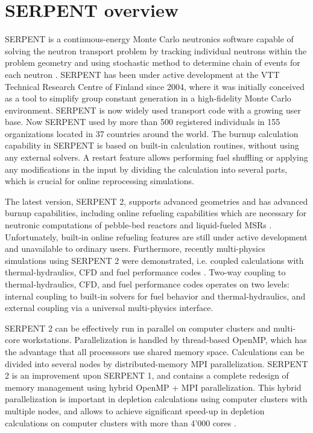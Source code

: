 \section{SERPENT overview}
SERPENT is a continuous-energy Monte Carlo neutronics software capable of solving the neutron transport problem by tracking individual neutrons within the problem geometry and using stochastic method to determine chain of events for each neutron \cite{leppanen_serpent_2015}. SERPENT has been under active development at the VTT Technical Research Centre of Finland since 2004, where it was initially conceived as a tool to simplify group constant generation in a high-fidelity Monte Carlo environment. SERPENT is now widely used transport code  with a growing user base. Now SERPENT used by more than 500 registered individuals in 155 organizations located in 37 countries around the world. The burnup calculation capability in SERPENT is based on built-in calculation routines, without using any external solvers. A restart feature allows performing fuel shuffling or applying any modifications in the input by dividing the calculation into several parts, which is crucial for online reprocessing simulations.

The latest version, SERPENT 2, supports advanced geometries and has advanced burnup capabilities, including online refueling capabilities which are necessary for neutronic computations of pebble-bed reactors and liquid-fueled \glspl{MSR} \cite{aufiero_extended_2013}. Unfortunately, built-in online refueling features are still under active development and unavailable to ordinary users. Furthermore, recently multi-physics simulations using SERPENT 2 were demonstrated, i.e. coupled calculations with thermal-hydraulics, \gls{CFD} and fuel performance codes \cite{leppanen_numerical_2015}. Two-way coupling to thermal-hydraulics, \gls{CFD}, and fuel performance codes operates on two levels: internal coupling to built-in solvers for fuel behavior and thermal-hydraulics, and external coupling via a universal multi-physics interface. 

SERPENT 2 can be effectively run in parallel on computer clusters and multi-core workstations. Parallelization is handled by thread-based OpenMP, which has the advantage that all processsors use shared memory space. Calculations can be divided into several nodes by distributed-memory \gls{MPI} parallelization. SERPENT 2  is an improvement upon SERPENT 1, and contains a complete redesign of memory management using hybrid OpenMP \cite{dagum_openmp_1998} + \gls{MPI} parallelization.  This hybrid parallelization is important in depletion calculations using computer clusters with multiple nodes, and allows to achieve significant speed-up in depletion calculations on computer clusters with more than 4'000 cores \cite{leppanen_serpent_2015}. 

